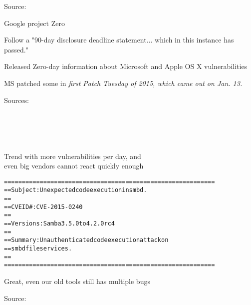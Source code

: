 \documentclass[20pt,landscape,a4paper,footrule]{foils}
\begin{document}
Source:\\
{\footnotesize
{}}



\begin{list1}
\item Google project Zero
\item Follow a
"90-day disclosure deadline statement... which in this instance has passed."
\item Released Zero-day information about Microsoft and Apple OS X vulnerabilities
\item MS patched some in \emph{first Patch Tuesday of 2015, which came out on Jan. 13.}
\end{list1}

Sources:\\
{\tiny
{}\\
\\
\\
\\
}

Trend with more vulnerabilities per day, and\\
even big vendors cannot react quickly enough




\begin{alltt}\small
  ===========================================================
  == Subject:     Unexpected code execution in smbd.
  ==
  == CVE ID#:     CVE-2015-0240
  ==
  == Versions:    Samba 3.5.0 to 4.2.0rc4
  ==
  == Summary:     Unauthenticated code execution attack on
  ==		smbd file services.
  ==
  ===========================================================
\end{alltt}

\centerline{Great, even our old tools still has multiple bugs}

Source:\\
\end{document}
